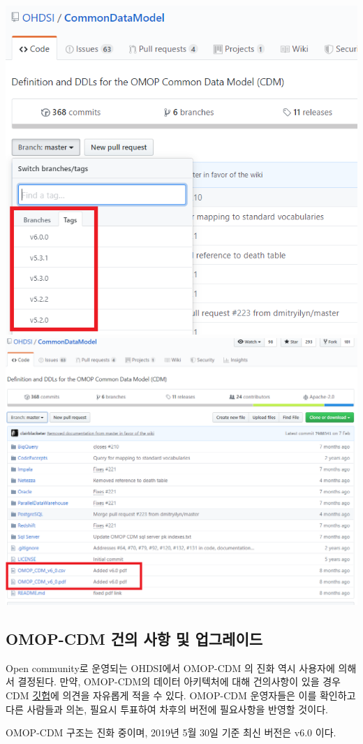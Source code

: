 \documentclass[]{book}
\begin{document}
\includegraphics[width=0.8\linewidth]{images/CommonDataModel/github_tags}
\includegraphics[width=0.8\linewidth]{images/CommonDataModel/github_pdf}

\hypertarget{omop-cdm----}{%
\subsection{OMOP-CDM 건의 사항 및 업그레이드}\label{omop-cdm----}}

Open community로 운영되는 OHDSI에서 OMOP-CDM 의 진화 역시 사용자에 의해서 결정된다. 만약, OMOP-CDM의 데이터 아키텍처에 대해 건의사항이 있을 경우 CDM \href{https://github.com/ohdsi/commondatamodel/issues}{깃헙}에 의견을 자유롭게 적을 수 있다. OMOP-CDM 운영자들은 이를 확인하고 다른 사람들과 의논, 필요시 투표하여 차후의 버전에 필요사항을 반영할 것이다.

OMOP-CDM 구조는 진화 중이며, 2019년 5월 30일 기준 최신 버전은 v6.0 이다.
\end{document}
